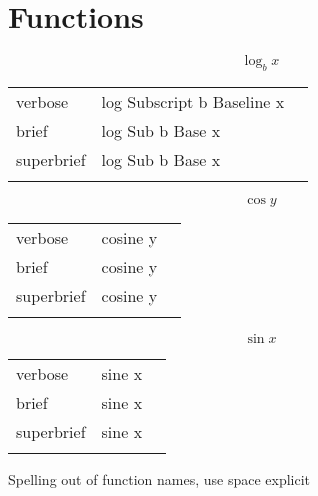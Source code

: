 
\section{Functions}
\label{sec:functions}

\R
\E \[\log_bx\]
\begin{longtable}[c]{@{}lll@{}}
\toprule\addlinespace
verbose & log Subscript b Baseline x &

\\\addlinespace
brief & log Sub b Base x &

\\\addlinespace
superbrief & log Sub b Base x &

\\\addlinespace
\bottomrule
\end{longtable}


\E \[\cos y\]
\begin{longtable}[c]{@{}lll@{}}
\toprule\addlinespace
verbose & cosine y &

\\\addlinespace
brief & cosine y &

\\\addlinespace
superbrief & cosine y &

\\\addlinespace
\bottomrule
\end{longtable}


\E \[\sin x\]
\begin{longtable}[c]{@{}lll@{}}
\toprule\addlinespace
verbose & sine x &

\\\addlinespace
brief & sine x &

\\\addlinespace
superbrief & sine x &

\\\addlinespace
\bottomrule
\end{longtable}


\R
Spelling out of function names, use space explicit

